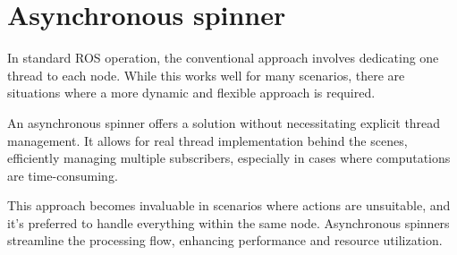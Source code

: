 \section{Asynchronous spinner}

In standard ROS operation, the conventional approach involves dedicating one thread to each node. 
While this works well for many scenarios, there are situations where a more dynamic and flexible approach is required.

An asynchronous spinner offers a solution without necessitating explicit thread management. 
It allows for real thread implementation behind the scenes, efficiently managing multiple subscribers, especially in cases where computations are time-consuming.

This approach becomes invaluable in scenarios where actions are unsuitable, and it's preferred to handle everything within the same node. 
Asynchronous spinners streamline the processing flow, enhancing performance and resource utilization.